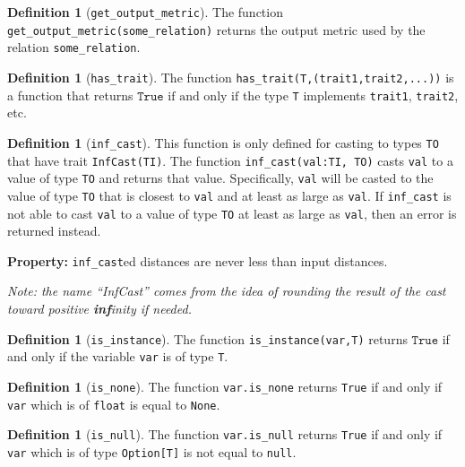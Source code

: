 \documentclass[11pt,a4paper]{article}
\theoremstyle{definition}
\newtheorem{definition}[theorem]{Definition}
\newcommand{\True}{\texttt{True}}
\newcommand{\iffText}{\text{if and only if}}
\begin{document}
\begin{definition}[\texttt{get\_output\_metric}]
    The function \texttt{get\_output\_metric(some\_relation)} returns the output metric used by the relation \texttt{some\_relation}.
\end{definition}

\begin{definition}[\texttt{has\_trait}]
    The function \texttt{has\_trait(T,(trait1,trait2,...))} is a function that returns $\True$ $\iffText$ the type \texttt{T} implements \texttt{trait1}, \texttt{trait2}, etc.
\end{definition}

\begin{definition}[\texttt{inf\_cast}]
\label{defn:inf-cast}
    This function is only defined for casting to types \texttt{TO} that have trait \texttt{InfCast(TI)}. The function \texttt{inf\_cast(val:TI, TO)} casts \texttt{val} to a value of type \texttt{TO} and returns that value. Specifically, \texttt{val} will be casted to the value of type \texttt{TO} that is closest to \texttt{val} and at least as large as \texttt{val}. If \texttt{inf\_cast} is not able to cast \texttt{val} to a value of type \texttt{TO} at least as large as \texttt{val}, then an error is returned instead.
    
    \textbf{Property:} \texttt{inf\_cast}ed distances are never less than input distances.
    
    \emph{Note: the name ``InfCast'' comes from the idea of rounding the result of the cast toward positive \textbf{inf}inity if needed.}
\end{definition}

\begin{definition}[\texttt{is\_instance}]
    The function \texttt{is\_instance(var,T)} returns $\True$ if and only if the variable \texttt{var} is of type \texttt{T}.
\end{definition}

\begin{definition}[\texttt{is\_none}]
    The function \texttt{var.is\_none} returns \texttt{True} if and only if \texttt{var} which is of \texttt{float} is equal to \texttt{None}.
\end{definition}

\begin{definition}[\texttt{is\_null}]
    The function \texttt{var.is\_null} returns \texttt{True} if and only if \texttt{var} which is of type \texttt{Option[T]} is not equal to \texttt{null}.
\end{definition}
\end{document}
